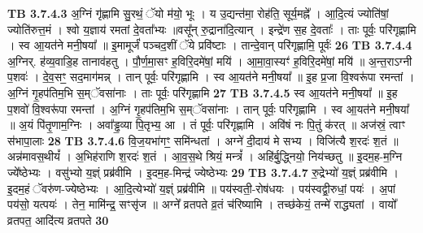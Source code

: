 \documentclass[17pt]{extarticle}
\begin{document}
{{{{{{{{{{{{{{{{{{{                  \newline
                                \textbf{ TB 3.7.4.3} \newline
                  अ॒ग्निं गृ॑ह्णामि सु॒रथं॒ ॅयो म॑यो॒ भूः । य उ॒द्यन्त॑मा॒ रोह॑ति॒ सूर्य॒मह्ने᳚ । आ॒दि॒त्यं ज्योति॑षां॒ ज्योति॑रुत्त॒मं । श्वो य॒ज्ञाय॑ रमतां दे॒वता᳚भ्यः ॥वसू᳚न् रु॒द्राना॑दि॒त्यान् । इन्द्रे॑ण स॒ह दे॒वताः᳚ । ताः पूर्वः॒ परि॑गृह्णामि । स्व आ॒यत॑ने मनी॒षया᳚ ॥ इ॒मामूर्जं॑ पञ्चद॒शीं ॅये प्रवि॑ष्टाः । तान्दे॒वान् परि॑गृह्णामि॒ पूर्वः॑ \textbf{ 26} \newline
                  \newline
                                \textbf{ TB 3.7.4.4} \newline
                  अ॒ग्निर्. ह॑व्य॒वाडि॒ह तानाव॑हतु । पौ॒र्ण॒मा॒सꣳ ह॒विरि॒दमे॑षां॒ मयि॑ । आ॒मा॒वा॒स्यꣳ॑ ह॒विरि॒दमे॑षां॒ मयि॑ ॥ अ॒न्त॒राऽग्नी प॒शवः॑ । दे॒व॒सꣳ॒॒ सद॒माग॑मन्न् । तान् पूर्वः॒ परि॑गृह्णामि । स्व आ॒यत॑ने मनी॒षया᳚ ॥ इ॒ह प्र॒जा वि॒श्वरू॑पा रमन्तां । अ॒ग्निं गृ॒हप॑तिम॒भि स॒म्ॅवसा॑नाः । ताः पूर्वः॒ परि॑गृह्णामि \textbf{ 27} \newline
                  \newline
                                \textbf{ TB 3.7.4.5} \newline
                  स्व आ॒यत॑ने मनी॒षया᳚ ॥ इ॒ह प॒शवो॑ वि॒श्वरू॑पा रमन्तां । अ॒ग्निं गृ॒हप॑तिम॒भि स॒म्ॅवसा॑नाः । तान् पूर्वः॒ परि॑गृह्णामि । स्व आ॒यत॑ने मनी॒षया᳚ ॥ अ॒यं पि॑तृ॒णाम॒ग्निः । अवा᳚ड्ढ॒व्या पि॒तृभ्य॒ आ । तं पूर्वः॒ परि॑गृह्णामि । अवि॑षं नः पि॒तुं क॑रत् ॥ अज॑स्रं॒ त्वाꣳ स॑भापा॒लाः \textbf{ 28} \newline
                  \newline
                                \textbf{ TB 3.7.4.6} \newline
                  वि॒ज॒यभा॑गꣳ॒॒ समि॑न्धतां । अग्ने॑ दी॒दाय॑ मे सभ्य । विजि॑त्यै श॒रदः॑ श॒तं ॥ अन्न॑मावस॒थीयं᳚ । अ॒भिह॑राणि श॒रदः॑ श॒तं । आ॒व॒स॒थे श्रियं॒ मन्त्रं᳚ । अहि॑र्बु॒द्ध्नियो॒ निय॑च्छतु ॥ इ॒दम॒ह-म॒ग्नि ज्ये᳚ष्ठेभ्यः । वसु॑भ्यो य॒ज्ञ्ं प्रब्र॑वीमि । इ॒दम॒ह-मिन्द्र॑ ज्येष्ठेभ्यः \textbf{ 29} \newline
                  \newline
                                \textbf{ TB 3.7.4.7} \newline
                  रु॒द्रेभ्यो॑ य॒ज्ञ्ं प्रब्र॑वीमि । इ॒दम॒हं ॅवरु॑ण-ज्येष्ठेभ्यः । आ॒दि॒त्येभ्यो॑ य॒ज्ञ्ं प्रब्र॑वीमि ॥ पय॑स्वती॒-रोष॑धयः । पय॑स्वद्वी॒रुधां॒ पयः॑ । अ॒पां पय॑सो॒ यत्पयः॑ । तेन॒ मामि॑न्द्र॒ सꣳसृ॑ज ॥ अग्ने᳚ व्रतपते व्र॒तं च॑रिष्यामि । तच्छ॑केयं॒ तन्मे॑ राद्ध्यतां । वायो᳚ व्रतपत॒ आदि॑त्य व्रतपते \textbf{ 30} \newline
}}}}}}}}}}}}}}}}}}}
\end{document}
